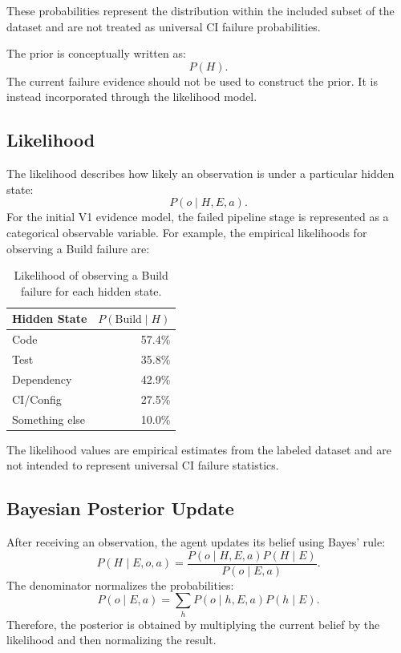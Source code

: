 \documentclass{article}
\begin{document}
These probabilities represent the distribution within the included subset of the dataset and are not treated as universal CI failure probabilities.

The prior is conceptually written as:
\[
P(H).
\]
The current failure evidence should not be used to construct the prior. It is instead incorporated through the likelihood model.

\subsection{Likelihood}

The likelihood describes how likely an observation is under a particular hidden state:
\[
P(o \mid H,E,a).
\]
For the initial V1 evidence model, the failed pipeline stage is represented as a categorical observable variable. For example, the empirical likelihoods for observing a Build failure are:

\begin{table}[t]
\centering
\caption{Likelihood of observing a Build failure for each hidden state.}
\label{tab:buildlikelihood}
\begin{tabular}{lr}
\toprule
Hidden State & $P(\text{Build}\mid H)$ \\
\midrule
Code & 57.4\% \\
Test & 35.8\% \\
Dependency & 42.9\% \\
CI/Config & 27.5\% \\
Something else & 10.0\% \\
\bottomrule
\end{tabular}
\end{table}

The likelihood values are empirical estimates from the labeled dataset and are not intended to represent universal CI failure statistics.

\subsection{Bayesian Posterior Update}

After receiving an observation, the agent updates its belief using Bayes' rule:
\[
P(H\mid E,o,a) = \frac{P(o\mid H,E,a)P(H\mid E)}{P(o\mid E,a)}.
\]
The denominator normalizes the probabilities:
\[
P(o\mid E,a) = \sum_{h} P(o\mid h,E,a)P(h\mid E).
\]
Therefore, the posterior is obtained by multiplying the current belief by the likelihood and then normalizing the result.
\end{document}
